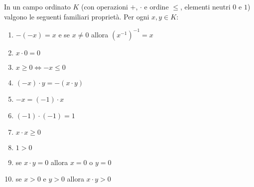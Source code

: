 \documentclass[italian,a4paper,twosides,headinclude]{scrbook}
\newcommand{\enclose}[1]{{\left( #1 \right)}}
\begin{document}
\begin{theorem}
In un campo ordinato $K$ (con operazioni $+$, $\cdot$ e ordine $\le$, elementi neutri $0$ e $1$) valgono le seguenti
familiari proprietà. Per ogni $x,y\in K$:
\begin{enumerate}
  \item $-(-x) = x$ e se $x\neq 0$ allora $\enclose{x^{-1}}^{-1}=x$
  \item $x \cdot 0 = 0$
  \item $x\ge 0 \iff -x \le 0$
  \item $(-x)\cdot y = -(x\cdot y)$
  \item $-x = (-1)\cdot x$
  \item $(-1)\cdot(-1) = 1$
  \item $x\cdot x \ge 0$
  \item $1 > 0$
  \item se $x\cdot y = 0$ allora $x = 0$ o $y = 0$
  \item se $x>0$ e $y>0$  allora $x\cdot y > 0$
\end{enumerate}
\end{theorem}
%
\end{document}
